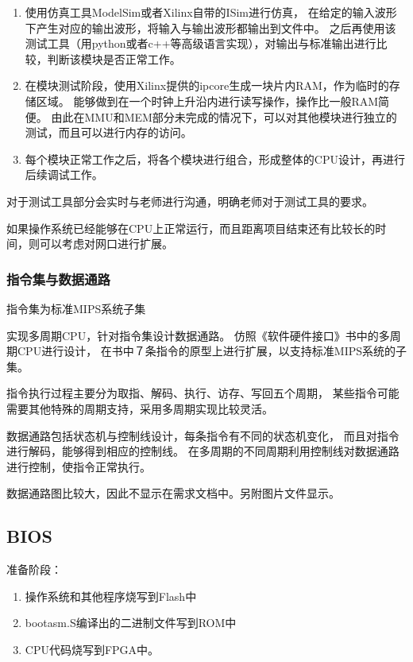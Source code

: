             \begin{enumerate}
            \item
            使用仿真工具ModelSim或者Xilinx自带的ISim进行仿真，
            在给定的输入波形下产生对应的输出波形，将输入与输出波形都输出到文件中。
            之后再使用该测试工具（用python或者c++等高级语言实现），对输出与标准输出进行比较，判断该模块是否正常工作。

            \item
            在模块测试阶段，使用Xilinx提供的ipcore生成一块片内RAM，作为临时的存储区域。
            能够做到在一个时钟上升沿内进行读写操作，操作比一般RAM简便。
            由此在MMU和MEM部分未完成的情况下，可以对其他模块进行独立的测试，而且可以进行内存的访问。

            \item
            每个模块正常工作之后，将各个模块进行组合，形成整体的CPU设计，再进行后续调试工作。

            \end{enumerate}
            对于测试工具部分会实时与老师进行沟通，明确老师对于测试工具的要求。

            如果操作系统已经能够在CPU上正常运行，而且距离项目结束还有比较长的时间，则可以考虑对网口进行扩展。


        \subsubsection{指令集与数据通路}
            指令集为标准MIPS系统子集

            实现多周期CPU，针对指令集设计数据通路。
            仿照《软件硬件接口》书中的多周期CPU进行设计，
            在书中７条指令的原型上进行扩展，以支持标准MIPS系统的子集。
            
            指令执行过程主要分为取指、解码、执行、访存、写回五个周期，
            某些指令可能需要其他特殊的周期支持，采用多周期实现比较灵活。

            数据通路包括状态机与控制线设计，每条指令有不同的状态机变化，
            而且对指令进行解码，能够得到相应的控制线。%
            在多周期的不同周期利用控制线对数据通路进行控制，使指令正常执行。
            
            数据通路图比较大，因此不显示在需求文档中。另附图片文件显示。

            
    \subsection{BIOS}
        准备阶段：
        \begin{enumerate}
            \item
                操作系统和其他程序烧写到Flash中%
            \item
                bootasm.S编译出的二进制文件写到ROM中
            \item
                CPU代码烧写到FPGA中。
        \end{enumerate}

